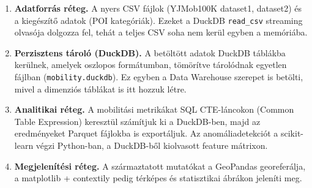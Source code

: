 \begin{enumerate}
    \item \textbf{Adatforrás réteg.} A nyers CSV fájlok (YJMob100K dataset1, dataset2) és a kiegészítő adatok (POI kategóriák). Ezeket a DuckDB \texttt{read\_csv} streaming olvasója dolgozza fel, tehát a teljes CSV soha nem kerül egyben a memóriába.

    \item \textbf{Perzisztens tároló (DuckDB).} A betöltött adatok DuckDB táblákba kerülnek, amelyek oszlopos formátumban, tömörítve tárolódnak egyetlen fájlban (\texttt{mobility.duckdb}). Ez egyben a Data Warehouse szerepet is betölti, mivel a dimenziós táblákat is itt hozzuk létre.

    \item \textbf{Analitikai réteg.} A mobilitási metrikákat SQL CTE-láncokon (Common Table Expression) keresztül számítjuk ki a DuckDB-ben, majd az eredményeket Parquet fájlokba is exportáljuk. Az anomáliadetekciót a scikit-learn végzi Python-ban, a DuckDB-ből kiolvasott feature mátrixon.

    \item \textbf{Megjelenítési réteg.} A származtatott mutatókat a GeoPandas georeferálja, a matplotlib + contextily pedig térképes és statisztikai ábrákon jeleníti meg.
\end{enumerate}

